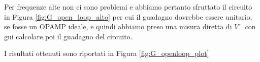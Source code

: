 Per frequenze alte non ci sono problemi e abbiamo pertanto sfruttato il circuito in Figura \ref{fig:G_open_loop_alto} per cui il guadagno dovrebbe essere unitario, se fosse un OPAMP ideale, e quindi abbiamo preso una misura diretta di $V^-$ con gui calcolare poi il guadagno del circuito.

I risultati ottenuti sono riportati in Figura \ref{fig:G_openloop_plot}




